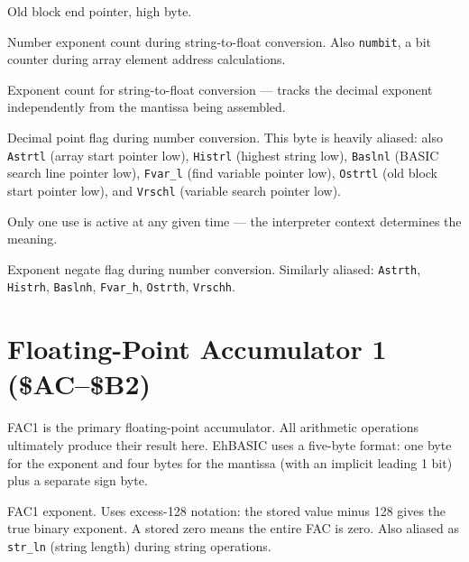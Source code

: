 
Old block end pointer, high byte.


Number exponent count during string-to-float conversion.  Also \texttt{numbit},
a bit counter during array element address calculations.


Exponent count for string-to-float conversion --- tracks the decimal exponent
independently from the mantissa being assembled.


Decimal point flag during number conversion.  This byte is heavily aliased:
also \texttt{Astrtl} (array start pointer low), \texttt{Histrl} (highest
string low), \texttt{Baslnl} (BASIC search line pointer low),
\texttt{Fvar\_l} (find variable pointer low), \texttt{Ostrtl} (old block
start pointer low), and \texttt{Vrschl} (variable search pointer low).

Only one use is active at any given time --- the interpreter context determines
the meaning.


Exponent negate flag during number conversion.  Similarly aliased:
\texttt{Astrth}, \texttt{Histrh}, \texttt{Baslnh}, \texttt{Fvar\_h},
\texttt{Ostrth}, \texttt{Vrschh}.

\section{Floating-Point Accumulator 1 (\$AC--\$B2)}

FAC1 is the primary floating-point accumulator.  All arithmetic operations
ultimately produce their result here.  EhBASIC uses a five-byte format: one
byte for the exponent and four bytes for the mantissa (with an implicit
leading 1 bit) plus a separate sign byte.


FAC1 exponent.  Uses excess-128 notation: the stored value minus 128 gives the
true binary exponent.  A stored zero means the entire FAC is zero.  Also
aliased as \texttt{str\_ln} (string length) during string operations.

